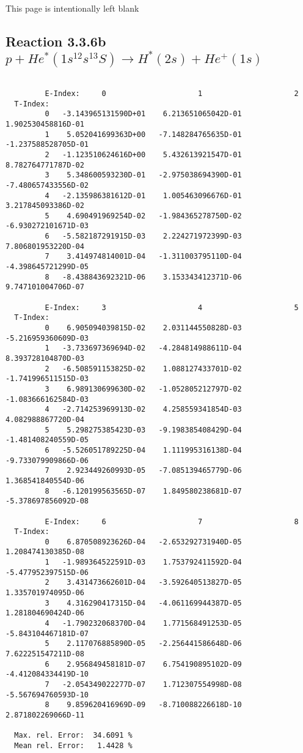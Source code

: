 \documentclass[12pt,dvipdfmx]{article}
\begin{document}
\newpage
This page is intentionally left blank
\newpage

\subsection{
Reaction 3.3.6b   $p + He^*(1s^12s^13S) \rightarrow H^*(2s) + He^+(1s) $
}


\begin{small}\begin{verbatim}

         E-Index:     0                     1                     2
  T-Index:
         0   -3.143965131590D+01    6.213651065042D-01    1.902530458816D-01
         1    5.052041699363D+00   -7.148284765635D-01   -1.237588528705D-01
         2   -1.123510624616D+00    5.432613921547D-01    8.782764771787D-02
         3    5.348600593230D-01   -2.975038694390D-01   -7.480657433556D-02
         4   -2.135986381612D-01    1.005463096676D-01    3.217845093386D-02
         5    4.690491969254D-02   -1.984365278750D-02   -6.930272101671D-03
         6   -5.582187291915D-03    2.224271972399D-03    7.806801953220D-04
         7    3.414974814001D-04   -1.311003795110D-04   -4.398645721299D-05
         8   -8.438843692321D-06    3.153343412371D-06    9.747101004706D-07

         E-Index:     3                     4                     5
  T-Index:
         0    6.905094039815D-02    2.031144550828D-03   -5.216959360609D-03
         1   -3.733697369694D-02   -4.284814988611D-04    8.393728104870D-03
         2   -6.508591153825D-02    1.088127433701D-02   -1.741996511515D-03
         3    6.989130699630D-02   -1.052805212797D-02   -1.083666162584D-03
         4   -2.714253969913D-02    4.258559341854D-03    4.082988867720D-04
         5    5.298275385423D-03   -9.198385408429D-04   -1.481408240559D-05
         6   -5.526051789225D-04    1.111995316138D-04   -9.733079909866D-06
         7    2.923449260993D-05   -7.085139465779D-06    1.368541840554D-06
         8   -6.120199563565D-07    1.849580238681D-07   -5.378697856092D-08

         E-Index:     6                     7                     8
  T-Index:
         0    6.870508923626D-04   -2.653292731940D-05    1.208474130385D-08
         1   -1.989364522591D-03    1.753792411592D-04   -5.477952397515D-06
         2    3.431473662601D-04   -3.592640513827D-05    1.335701974095D-06
         3    4.316290417315D-04   -4.061169944387D-05    1.281804690424D-06
         4   -1.790232068370D-04    1.771568491253D-05   -5.843104467181D-07
         5    2.117076885890D-05   -2.256441586648D-06    7.622251547211D-08
         6    2.956849458181D-07    6.754190895102D-09   -4.412084334419D-10
         7   -2.054349022277D-07    1.712307554998D-08   -5.567694760593D-10
         8    9.859620416969D-09   -8.710088226618D-10    2.871802269066D-11

  Max. rel. Error:  34.6091 %
  Mean rel. Error:   1.4428 %
\end{verbatim}\end{small}
\end{document}
